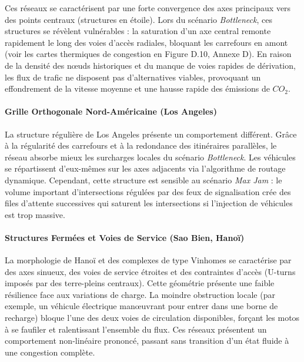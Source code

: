 \documentclass[10pt, a4paper]{article}
\begin{document}
Ces réseaux se caractérisent par une forte convergence des axes
principaux vers des points centraux (structures en étoile). Lors du
scénario \emph{Bottleneck}, ces structures se révèlent vulnérables : la
saturation d'un axe central remonte rapidement le long des voies d'accès
radiales, bloquant les carrefours en amont (voir les cartes thermiques
de congestion en Figure D.10, Annexe D). En raison de la densité des
nœuds historiques et du manque de voies rapides de dérivation, les flux
de trafic ne disposent pas d'alternatives viables, provoquant un
effondrement de la vitesse moyenne et une hausse rapide des émissions de
\(CO_2\).

\paragraph{Grille Orthogonale Nord-Américaine (Los
Angeles)}\label{grille-orthogonale-nord-amuxe9ricaine-los-angeles}

La structure régulière de Los Angeles présente un comportement
différent. Grâce à la régularité des carrefours et à la redondance des
itinéraires parallèles, le réseau absorbe mieux les surcharges locales
du scénario \emph{Bottleneck}. Les véhicules se répartissent d'eux-mêmes
sur les axes adjacents via l'algorithme de routage dynamique. Cependant,
cette structure est sensible au scénario \emph{Max Jam} : le volume
important d'intersections régulées par des feux de signalisation crée
des files d'attente successives qui saturent les intersections si
l'injection de véhicules est trop massive.

\paragraph{Structures Fermées et Voies de Service (Sao Bien,
Hanoï)}\label{structures-fermuxe9es-et-voies-de-service-sao-bien-hanouxef}

La morphologie de Hanoï et des complexes de type Vinhomes se caractérise
par des axes sinueux, des voies de service étroites et des contraintes
d'accès (U-turns imposés par des terre-pleins centraux). Cette géométrie
présente une faible résilience face aux variations de charge. La moindre
obstruction locale (par exemple, un véhicule électrique manœuvrant pour
entrer dans une borne de recharge) bloque l'une des deux voies de
circulation disponibles, forçant les motos à se faufiler et ralentissant
l'ensemble du flux. Ces réseaux présentent un comportement non-linéaire
prononcé, passant sans transition d'un état fluide à une congestion
complète.
\end{document}
